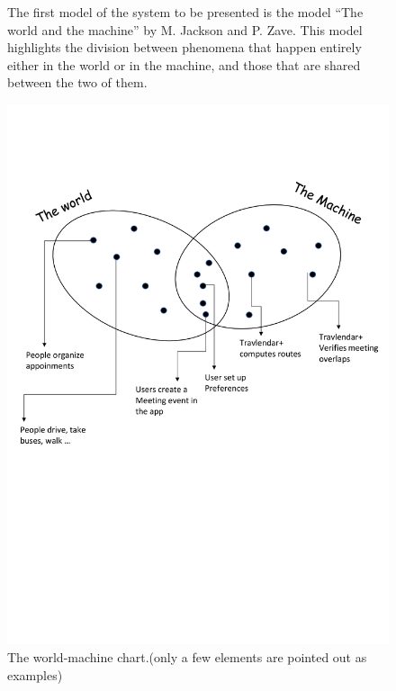 \begin{figure}
	\begin{flushleft}
		The first model of the system to be presented is the model ``The world and the machine'' by M. Jackson and P. Zave. This model highlights the division between phenomena that happen entirely either in the world or in the machine, and those that are shared between the two of them.
	\end{flushleft}
	\centering
	\includegraphics[width=0.7\linewidth]{images/World-Machine}
	\caption{The world-machine chart.(only a few elements are pointed out as examples)}
	\label{fig:world-machine}
\end{figure}
